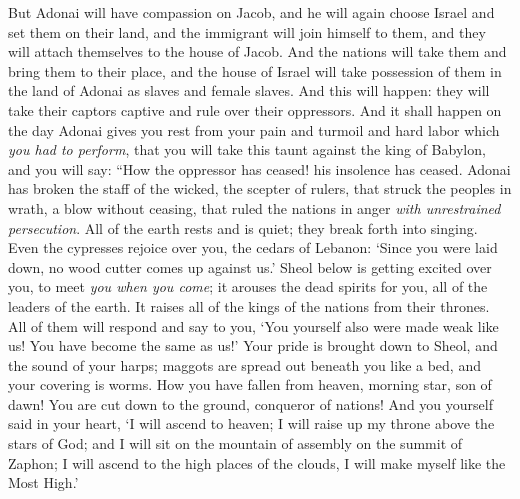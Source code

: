\begin{biblechapter} %
 But Adonai will have compassion on Jacob, 
and he will again choose Israel 
and set them on their land, 
and the immigrant will join himself to them, 
and they will attach themselves to the house of Jacob.
\verse And the nations will take them 
and bring them to their place, 
and the house of Israel will take possession of them in the land of Adonai 
as slaves and female slaves. And this will happen: they will take their captors captive 
and rule over their oppressors.
 And it shall happen on the day Adonai gives you rest from your pain and turmoil and hard labor which \textit{you had to perform},
\verse that you will take this taunt against the king of Babylon, 
and you will say: 
“How the oppressor has ceased! 
his insolence has ceased.
\verse Adonai has broken the staff of the wicked, 
the scepter of rulers,
\verse that struck the peoples in wrath, a blow without ceasing, 
that ruled the nations in anger 
\textit{with unrestrained persecution}.
\verse All of the earth rests and is quiet; 
they break forth into singing.
\verse Even the cypresses rejoice over you, 
the cedars of Lebanon: 
‘Since you were laid down, 
no wood cutter comes up against us.’
\verse Sheol below is getting excited over you, 
to meet \textit{you when you come}; 
it arouses the dead spirits for you, 
all of the leaders of the earth. 
It raises all of the kings of the nations from their thrones.
\verse All of them will respond and say to you, 
‘You yourself also were made weak like us! 
You have become the same as us!’
\verse Your pride is brought down to Sheol, 
and the sound of your harps; 
maggots are spread out beneath you like a bed, 
and your covering is worms.
\verse How you have fallen from heaven, morning star, son of dawn! 
You are cut down to the ground, conqueror of nations!
\verse And you yourself said in your heart,
\verse ‘I will ascend to heaven; 
I will raise up my throne above the stars of God; 
and I will sit on the mountain of assembly 
on the summit of Zaphon;
\verse I will ascend to the high places of the clouds, 
I will make myself like the Most High.’

\end{biblechapter}

